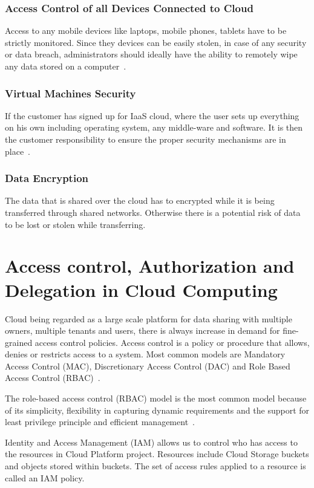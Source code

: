 \subsubsection{Access Control of all Devices Connected to Cloud}
Access to any mobile devices like laptops, mobile phones, tablets 
have to be strictly monitored. Since they devices can be easily
stolen, in case of any security or data breach, administrators
should ideally have the ability to remotely wipe any data
stored on a computer~\cite{hid-sp18-513-diversity}.

\subsubsection{Virtual Machines Security}
If the customer has signed up for IaaS cloud, where the user
sets up everything on his own including operating system,
any middle-ware and software. It is then the customer
responsibility to ensure the proper security mechanisms
are in place~\cite{hid-sp18-513-diversity}.

\subsubsection{Data Encryption}
The data that is shared over the cloud has to encrypted while it 
is being transferred through shared networks. Otherwise there is a 
potential risk of data to be lost or stolen while transferring.

\section{Access control, Authorization and Delegation in Cloud Computing}
Cloud being regarded as a large scale platform for data sharing with 
multiple owners, multiple tenants and users, there is always increase
in demand for fine-grained access control policies. Access control is
a policy or procedure that allows, denies or restricts access to a
system. Most common models are Mandatory Access Control (MAC),
Discretionary Access Control (DAC) and Role Based Access Control
(RBAC)~\cite{hid-sp18-513-accesscntrl}.

The role-based access control (RBAC) model is the most common 
model because of its simplicity, flexibility in capturing dynamic 
requirements and the support for least privilege principle 
and efficient management~\cite{hid-sp18-513-cloud3}. 

Identity and Access Management (IAM) allows us to control who has 
access to the resources in Cloud Platform project. Resources 
include Cloud Storage buckets and objects stored within buckets.
The set of access rules applied to a resource is called 
an IAM policy. 

